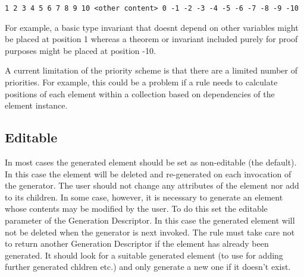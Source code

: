 \begin{verbatim}
1 2 3 4 5 6 7 8 9 10 <other content> 0 -1 -2 -3 -4 -5 -6 -7 -8 -9 -10
\end{verbatim}

For example, a basic type invariant that doesnt depend on other variables might be placed at position 1 whereas a theorem or invariant included purely for proof purposes might be placed at position -10. 

A current limitation of the priority scheme is that there are a limited number of priorities. For example, this could be a problem if a rule needs to calculate positions of each element within a collection based on dependencies of the element instance.

\subsection{Editable}
\label{sec:editable}
In most cases the generated element should be set as non-editable (the default). In this case the element will be deleted and re-generated on each invocation of the generator. The user should not change any attributes of the element nor add to its children. In some case, however, it is necessary to generate an element whose contents may be modified by the user. To do this set the editable parameter of the Generation Descriptor. In this case the generated element will not be deleted when the generator is next invoked. The rule must take care not to return another Generation Descriptor if the element has already been generated. It should look for a suitable generated element (to use for adding further generated chldren etc.) and only generate a new one if it doesn't exist.

%
%


